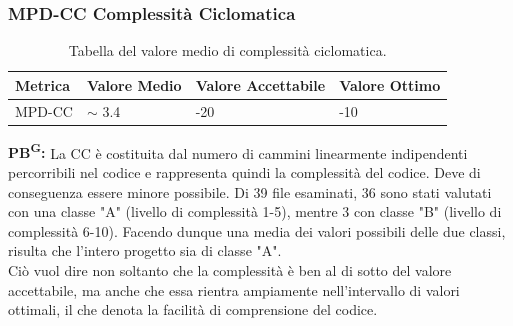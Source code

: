 \documentclass[8pt]{article}
\newcommand{\glossterm}[1]{#1\textsuperscript{G}} %
\begin{document}
\subsubsection{MPD-CC Complessità Ciclomatica}
\renewcommand{\arraystretch}{2.5}
\begin{longtable}{|>{\centering}p{3cm}|>{\centering\arraybackslash}p{3cm}|>{\centering\arraybackslash}p{3.5cm}|>{\centering\arraybackslash}p{3cm}|}
    \hline
    \rowcolor{white}
    \textbf{Metrica} & \textbf{Valore Medio} & \textbf{Valore Accettabile} & \textbf{Valore Ottimo} \\
    \hline
    \endfirsthead 
    \rowcolor{white}
    \caption{Tabella del valore medio di complessità ciclomatica.} 
    \label{table:Tabella del valore medio di complessità ciclomatica}
    \endlastfoot 
    MPD-CC & $\sim$ 3.4 & 11-20 & 1-10 \\
    \hline
\end{longtable}
\textbf{\glossterm{PB}:} La CC è costituita dal numero di cammini linearmente indipendenti percorribili nel codice e rappresenta quindi la complessità del codice. Deve di conseguenza essere minore possibile. Di 39 file esaminati, 36 sono stati valutati con una classe "A" (livello di complessità 1-5), mentre 3 con classe "B" (livello di complessità 6-10). Facendo dunque una media dei valori possibili delle due classi, risulta che l'intero progetto sia di classe "A".\\ Ciò vuol dire non soltanto che la complessità è ben al di sotto del valore accettabile, ma anche che essa rientra ampiamente nell'intervallo di valori ottimali, il che denota la facilità di comprensione del codice.
\clearpage
\end{document}
